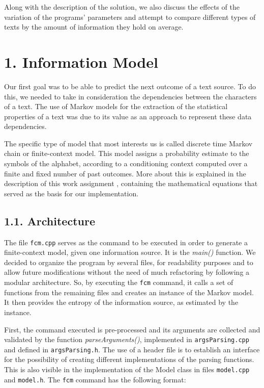 \documentclass[12pt]{article}
\begin{document}
Along with the description of the solution, we also discuss the effects
of the variation of the programs' parameters and attempt to compare 
different types of texts by the amount of information they hold on average.
\newpage

\section*{1. Information Model}

Our first goal was to be able to predict the next outcome of a text source.
To do this, we needed to take in consideration the dependencies between 
the characters of a text.
The use of Markov models for the extraction of the statistical properties of a
text was due to its value as an approach to represent these data dependencies.

The specific type of model that most interests us is called discrete time
Markov chain or finite-context model.
This model assigns a probability estimate to the symbols of the alphabet, 
according to a conditioning context computed over a finite and fixed number
of past outcomes. 
More about this is explained in the description of this work assignment 
\cite{trab1}, containing the mathematical equations that served as the basis 
for our implementation.

\subsection*{1.1. Architecture}

The file \texttt{fcm.cpp} serves as the command to be executed in order to 
generate a finite-context model, given one information source.
It is the {\it main()\/} function.
We decided to organize the program by several files, for readability purposes 
and to allow future modifications without the need of much refactoring by 
following a modular architecture.
So, by executing the \texttt{fcm} command, it calls a set of functions from 
the remaining files and creates an instance of the Markov model.
It then provides the entropy of the information source, as estimated by
the instance.

First, the command executed is pre-processed and its arguments are collected
and validated by the function {\it parseArguments()\/}, implemented in 
\texttt{argsParsing.cpp} and defined in \texttt{argsParsing.h}.
The use of a header file is to establish an interface for the possibility of
creating different implementations of the parsing functions.
This is also visible in the implementation of the Model class in files 
\texttt{model.cpp} and \texttt{model.h}.
The \texttt{fcm} command has the following format:
\end{document}
